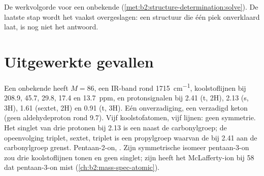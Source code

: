 \begin{omfigure}
\par\vspace{4pt}

{\small De werkvolgorde voor een onbekende (\cref{met:b2:structure-determination:solve}). De laatste stap
wordt het vaakst overgeslagen: een structuur die één piek onverklaard laat, is nog niet het antwoord.}
\end{omfigure}

\section{Uitgewerkte gevallen}

\begin{example}\label{ex:b2:structure-determination:ketone}
Een onbekende heeft $M = 86$, een IR-band rond \qty{1715}{cm^{-1}}, koolstoflijnen bij 208.9, 45.7, 29.8, 17.4 en
13.7~ppm, en protonsignalen bij 2.41 (t, 2H), 2.13 (s, 3H), 1.61 (sextet, 2H) en 0.91 (t, 3H).
Eén onverzadiging, een verzadigd keton (geen aldehydeproton rond 9.7). Vijf koolstofatomen, vijf lijnen:
geen symmetrie. Het singlet van drie protonen bij 2.13 is een  naast de carbonylgroep; de opeenvolging triplet,
sextet, triplet is een propylgroep waarvan de  bij 2.41 aan de carbonylgroep grenst. Pentaan-2-on,
. Zijn symmetrische isomeer pentaan-3-on zou drie koolstoflijnen tonen en geen singlet;
zijn  heeft het McLafferty-ion bij 58 dat pentaan-3-on mist (\cref{ch:b2:mass-spec-atomic}).
\end{example}

